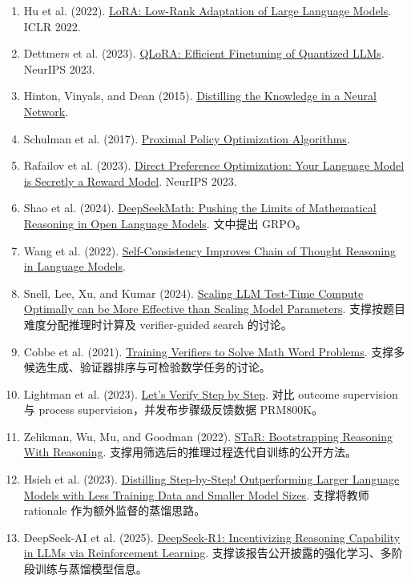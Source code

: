 \begin{enumerate}[leftmargin=2em]
  \item Hu et al. (2022). \href{https://arxiv.org/abs/2106.09685}{LoRA: Low-Rank Adaptation of Large Language Models}. ICLR 2022.
  \item Dettmers et al. (2023). \href{https://arxiv.org/abs/2305.14314}{QLoRA: Efficient Finetuning of Quantized LLMs}. NeurIPS 2023.
  \item Hinton, Vinyals, and Dean (2015). \href{https://arxiv.org/abs/1503.02531}{Distilling the Knowledge in a Neural Network}.
  \item Schulman et al. (2017). \href{https://arxiv.org/abs/1707.06347}{Proximal Policy Optimization Algorithms}.
  \item Rafailov et al. (2023). \href{https://arxiv.org/abs/2305.18290}{Direct Preference Optimization: Your Language Model is Secretly a Reward Model}. NeurIPS 2023.
  \item Shao et al. (2024). \href{https://arxiv.org/abs/2402.03300}{DeepSeekMath: Pushing the Limits of Mathematical Reasoning in Open Language Models}. 文中提出 GRPO。
  \item Wang et al. (2022). \href{https://arxiv.org/abs/2203.11171}{Self-Consistency Improves Chain of Thought Reasoning in Language Models}.
  \item Snell, Lee, Xu, and Kumar (2024). \href{https://arxiv.org/abs/2408.03314}{Scaling LLM Test-Time Compute Optimally can be More Effective than Scaling Model Parameters}. 支撑按题目难度分配推理时计算及 verifier-guided search 的讨论。
  \item Cobbe et al. (2021). \href{https://arxiv.org/abs/2110.14168}{Training Verifiers to Solve Math Word Problems}. 支撑多候选生成、验证器排序与可检验数学任务的讨论。
  \item Lightman et al. (2023). \href{https://arxiv.org/abs/2305.20050}{Let's Verify Step by Step}. 对比 outcome supervision 与 process supervision，并发布步骤级反馈数据 PRM800K。
  \item Zelikman, Wu, Mu, and Goodman (2022). \href{https://arxiv.org/abs/2203.14465}{STaR: Bootstrapping Reasoning With Reasoning}. 支撑用筛选后的推理过程迭代自训练的公开方法。
  \item Hsieh et al. (2023). \href{https://arxiv.org/abs/2305.02301}{Distilling Step-by-Step! Outperforming Larger Language Models with Less Training Data and Smaller Model Sizes}. 支撑将教师 rationale 作为额外监督的蒸馏思路。
  \item DeepSeek-AI et al. (2025). \href{https://arxiv.org/abs/2501.12948}{DeepSeek-R1: Incentivizing Reasoning Capability in LLMs via Reinforcement Learning}. 支撑该报告公开披露的强化学习、多阶段训练与蒸馏模型信息。

\end{enumerate}
